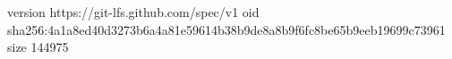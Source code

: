 version https://git-lfs.github.com/spec/v1
oid sha256:4a1a8ed40d3273b6a4a81e59614b38b9de8a8b9f6fc8be65b9eeb19699c73961
size 144975
